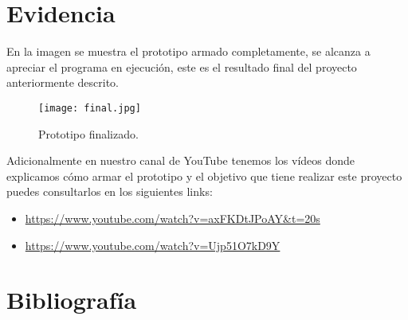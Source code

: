 \documentclass[10pt, a4paper, twocolumn]{article} %
\begin{document}
\newpage
\section{Evidencia}
En la imagen se muestra el prototipo armado completamente, se alcanza a apreciar el programa en ejecución, este es el resultado final del proyecto anteriormente descrito.
\begin{figure}[htbp]
	\begin{center}
		\texttt{[image: final.jpg]} %
		\caption{Prototipo finalizado.} %
	\end{center}
\end{figure}

Adicionalmente en nuestro canal de YouTube tenemos los vídeos donde explicamos cómo armar el prototipo y el objetivo que tiene realizar este proyecto puedes consultarlos en los siguientes links:\\
\bigskip
\begin{itemize}
\item \url{https://www.youtube.com/watch?v=axFKDtJPoAY&t=20s}
\item \url{https://www.youtube.com/watch?v=Ujp51O7kD9Y}
\end{itemize}

\section{Bibliografía}
\end{document}
